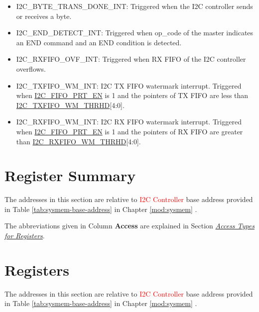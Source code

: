 \documentclass[main\_\_EN.tex]{subfiles}
\begin{document}
\begin{itemize}
\item \label{int:i2c-byte-trans-done}I2C\_BYTE\_TRANS\_DONE\_INT: Triggered when the I2C controller sends or receives a byte.
\item \label{int:i2c-end}I2C\_END\_DETECT\_INT: Triggered when op\_code of the master indicates an END command and an END condition is detected.
\item \label{int:i2c-rxfifo-ovf}I2C\_RXFIFO\_OVF\_INT: Triggered when RX FIFO of the I2C controller overflows.
\item \label{int:i2c-txfifo-wm}I2C\_TXFIFO\_WM\_INT: I2C TX FIFO watermark interrupt. Triggered when \hyperref[fielddesc:I2CFIFOPRTEN]{I2C\_FIFO\_PRT\_EN} is 1 and the pointers of TX FIFO are less than \hyperref[fielddesc:I2CTXFIFOWMTHRHD]{I2C\_TXFIFO\_WM\_THRHD}[4:0].
\item \label{int:i2c-rxfifo-wm}I2C\_RXFIFO\_WM\_INT: I2C RX FIFO watermark interrupt. Triggered when \hyperref[fielddesc:I2CFIFOPRTEN]{I2C\_FIFO\_PRT\_EN} is 1 and the pointers of RX FIFO are greater than \hyperref[fielddesc:I2CRXFIFOWMTHRHD]{I2C\_RXFIFO\_WM\_THRHD}[4:0].
\end{itemize}





\clearpage
\section{Register Summary}
\label{sec:i2c-reg-summ}
\hypertarget{i2c-reg-summ}{}

The addresses in this section are relative to \textcolor{red}{I2C Controller} base address provided in Table \ref{tab:sysmem-base-address} in Chapter \ref{mod:sysmem} \textit{}.

The abbreviations given in Column \textbf{Access} are explained in Section \hyperref[glossary-access-types]{\textit{Access Types for Registers}}.






\clearpage
\section{Registers}

The addresses in this section are relative to \textcolor{red}{I2C Controller} base address provided in Table \ref{tab:sysmem-base-address} in Chapter \ref{mod:sysmem} \textit{}.


\end{document}
